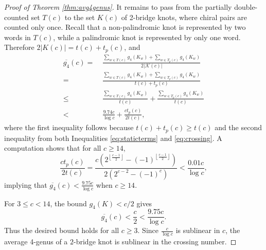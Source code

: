 \documentclass[12pt]{amsart}
\theoremstyle{definition}
\theoremstyle{remark}
\numberwithin{equation}{section}
\begin{document}
\begin{proof}[Proof of Theorem \ref{thm:avg4genus}]

It remains to pass from the partially double-counted set $T(c)$ to the set
$K(c)$ of 2-bridge knots, where chiral pairs are counted only once. Recall
that a non-palindromic knot is represented by two words in $T(c)$, while a
palindromic knot is represented by only one word. Therefore $2|K(c)|=t(c)+t_p(c)$, and
\begin{align*}\overline{g_4}(c) = &\; \frac{\sum_{w\in T(c)} g_4(K_w) + \sum_{w\in T_p(c)} g_4(K_w)}{2|\mathcal{K}(c)|}\\
= & \; \frac{\sum_{w\in T(c)} g_4(K_w) + \sum_{w\in T_p(c)} g_4(K_w)}{t(c) + t_p(c)}\\
\leq & \;\frac{\sum_{w\in T(c)} g_4(K_w)}{t(c)}  + \frac{\sum_{w\in T_p(c)} g_4(K_w)}{t(c)}\\
< & \; \frac{9.74 c}{\log c} + \frac{c t_p(c)}{2t(c)},
\end{align*}
where the first inequality follows because $t(c)+t_p(c)\geq t(c)$ and the second inequality from both Inequalities \eqref{eq:staticterms} and \eqref{eq:crossing}. %
A computation shows that for all $c\geq 14$,
\[\frac{c t_p(c)}{2t(c)} = \frac{c\left(2^{\left\lfloor\frac{c-1}{2}\right\rfloor}-(-1)^{\left\lfloor\frac{c-1}{2}\right\rfloor}\right)}{2\left(2^{c-2}-(-1)^{c}\right)} < \frac{0.01c}{\log c},\]
implying that $\overline{g_4}(c) < \frac{9.75 c}{\log c}$ when $c\geq 14$.

For $3\leq c<14$, the bound $g_4(K)<c/2$ gives
\[
\overline{g_4}(c)<\frac{c}{2}<\frac{9.75c}{\log c}.
\]
Thus the desired bound holds for all $c\geq 3$. Since $\frac{c}{\log c}$ is sublinear in $c$, the average 4-genus of a $2$-bridge knot is sublinear in the crossing number.
\end{proof}
\end{document}
